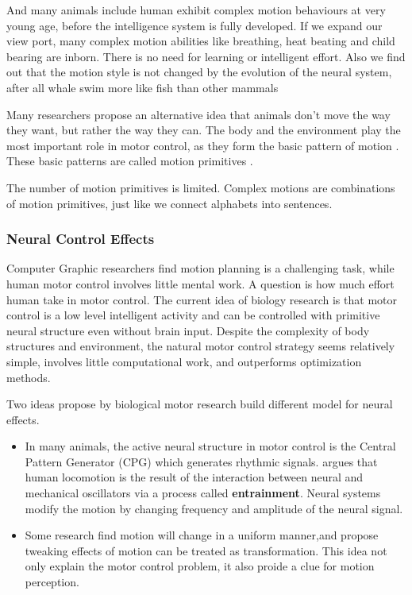 And many animals include human exhibit complex motion behaviours at very young age, before the intelligence system is fully developed.
If we expand our view port, many complex motion abilities like breathing, heat beating and child bearing are inborn.
There is no need for learning or intelligent effort.
Also we find out that the motion style is not changed by the evolution of the neural system, after all whale swim more like fish than other mammals

Many researchers propose an alternative idea that animals don’t move the way they want, but rather the way they can. 
The body and the environment play the most important role in motor control, as they form the basic pattern of motion \citep{nishikawa2007neuromechanics}.
These basic patterns are called motion primitives \citep{Poggio2004}.

The number of motion primitives is limited.
Complex motions are combinations of motion primitives, just like we connect alphabets into sentences.




\subsubsection*{Neural Control Effects}
Computer Graphic researchers find motion planning is a challenging task, while human motor control involves little mental work.
A question is how much effort human take in motor control.
The current idea of biology research is that motor control is a low level intelligent activity and can be controlled with primitive neural structure even without brain input. 
Despite the complexity of body structures and environment, the natural motor control strategy seems relatively simple, involves little computational work, and outperforms optimization methods. 

Two ideas propose by biological motor research build different model for neural effects.
\begin{itemize}
\item
In many animals, the active neural structure in motor control is the Central Pattern Generator (CPG) which generates rhythmic signals.
\citet{Cohen1988a} argues that human locomotion is the result of the interaction between neural and mechanical oscillators via a process called \textbf{entrainment}.
Neural systems modify the motion by changing frequency and amplitude of the neural signal.

\item
Some research find motion will change in a uniform manner\citep{Viviani1992},and propose tweaking effects of motion can be treated as transformation\citep{flash2007affine}.
This idea not only explain the motor control problem, it also proide a clue for motion perception.

\end{itemize}





